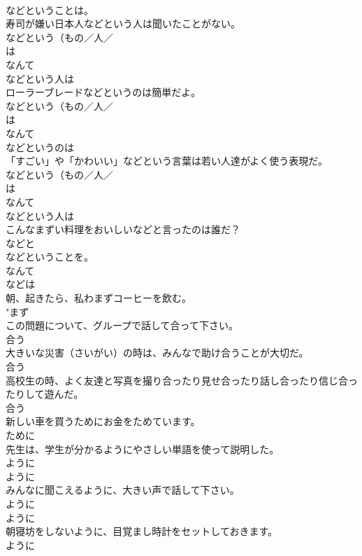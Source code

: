 \documentclass[8pt]{extreport}
\begin{document}
\begin{CJK}{UTF8}{min}
{\\	などということは。
\\	寿司が嫌い日本人などという人は聞いたことがない。	
\\	などという（もの／人／
\\	は 
\\	なんて 
\\	などという人は
\\	ローラーブレードなどというのは簡単だよ。	
\\	などという（もの／人／
\\	は 
\\	なんて 
\\	などというのは
\\	「すごい」や「かわいい」などという言葉は若い人達がよく使う表現だ。	
\\	などという（もの／人／
\\	は 
\\	なんて 
\\	などという人は
\\	こんなまずい料理をおいしいなどと言ったのは誰だ？	
\\	などと 
\\	などということを。 
\\	なんて 
\\	などは
\\	朝、起きたら、私わまずコーヒーを飲む。	
\\	"まず 
\\	この問題について、グループで話して合って下さい。	
\\	合う 
\\	大きいな災害（さいがい）の時は、みんなで助け合うことが大切だ。	
\\	合う 
\\	高校生の時、よく友達と写真を撮り合ったり見せ合ったり話し合ったり信じ合ったりして遊んだ。	
\\	合う 
\\	新しい車を買うためにお金をためています。	
\\	ために
\\	先生は、学生が分かるようにやさしい単語を使って説明した。	
\\	ように
\\	ように 
\\	みんなに聞こえるように、大きい声で話して下さい。	
\\	ように
\\	ように 
\\	朝寝坊をしないように、目覚まし時計をセットしておきます。	
\\	ように
}
\end{CJK}
\end{document}
